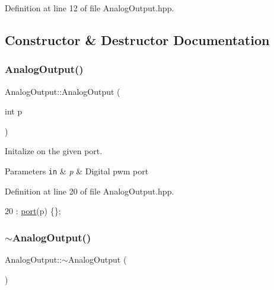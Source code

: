 Definition at line 12 of file Analog\+Output.\+hpp.



\subsection{Constructor \& Destructor Documentation}
\mbox{\label{class_analog_output_ab92457661db417a929abe3ebff3e8e60}} 
\subsubsection{\texorpdfstring{Analog\+Output()}{AnalogOutput()}}
{\footnotesize\ttfamily Analog\+Output\+::\+Analog\+Output (\begin{DoxyParamCaption}\item[{int}]{p }\end{DoxyParamCaption})\hspace{0.3cm}{\ttfamily [inline]}}



Initalize on the given port. 


\begin{DoxyParams}[1]{Parameters}
\mbox{\tt in}  & {\em p} & Digital pwm port \\
\hline
\end{DoxyParams}


Definition at line 20 of file Analog\+Output.\+hpp.


\begin{DoxyCode}
20 : \hyperlink{class_analog_output_a52a084ec21b0e7f4cf9eb29af2fd103c}{port}(p) \{\};
\end{DoxyCode}
\mbox{\label{class_analog_output_a7848a6b7b7c15bba5c75f0f82f3c1d53}} 
\subsubsection{\texorpdfstring{$\sim$\+Analog\+Output()}{~AnalogOutput()}}
{\footnotesize\ttfamily Analog\+Output\+::$\sim$\+Analog\+Output (\begin{DoxyParamCaption}{ }\end{DoxyParamCaption})\hspace{0.3cm}{\ttfamily [inline]}}



